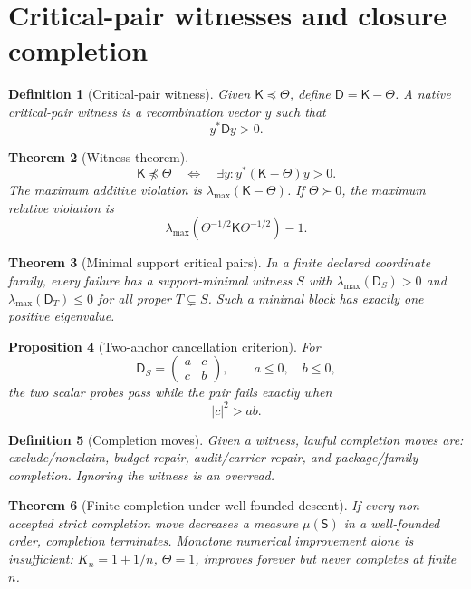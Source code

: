 \documentclass[11pt]{article}
\newtheorem{theorem}{Theorem}[section]
\newtheorem{proposition}[theorem]{Proposition}
\newtheorem{definition}[theorem]{Definition}
\newcommand{\K}{\mathsf K}
\newcommand{\Defect}{\mathsf D}
\begin{document}
\section{Critical-pair witnesses and closure completion}

\begin{definition}[Critical-pair witness]
Given \(\K\preceq\Theta\), define \(\Defect=\K-\Theta\).  A native critical-pair witness is a recombination vector \(y\) such that
\[
  y^*\Defect y>0.
\]
\end{definition}

\begin{theorem}[Witness theorem]
\[
  \K\npreceq\Theta
  \quad\Longleftrightarrow\quad
  \exists y: y^*(\K-\Theta)y>0.
\]
The maximum additive violation is \(\lambda_{\max}(\K-\Theta)\).  If \(\Theta\succ0\), the maximum relative violation is
\[
  \lambda_{\max}(\Theta^{-1/2}\K\Theta^{-1/2})-1.
\]
\end{theorem}

\begin{theorem}[Minimal support critical pairs]
In a finite declared coordinate family, every failure has a support-minimal witness \(S\) with \(\lambda_{\max}(\Defect_S)>0\) and \(\lambda_{\max}(\Defect_T)\le0\) for all proper \(T\subsetneq S\).  Such a minimal block has exactly one positive eigenvalue.
\end{theorem}

\begin{proposition}[Two-anchor cancellation criterion]
For
\[
  \Defect_S=\begin{pmatrix}a&c\\\bar c&b\end{pmatrix},
  \qquad a\le0,
  \quad b\le0,
\]
the two scalar probes pass while the pair fails exactly when
\[
  |c|^2>ab.
\]
\end{proposition}

\begin{definition}[Completion moves]
Given a witness, lawful completion moves are: exclude/nonclaim, budget repair, audit/carrier repair, and package/family completion.  Ignoring the witness is an overread.
\end{definition}

\begin{theorem}[Finite completion under well-founded descent]
If every non-accepted strict completion move decreases a measure \(\mu(\mathsf S)\) in a well-founded order, completion terminates.  Monotone numerical improvement alone is insufficient: \(K_n=1+1/n\), \(\Theta=1\), improves forever but never completes at finite \(n\).
\end{theorem}
\end{document}

